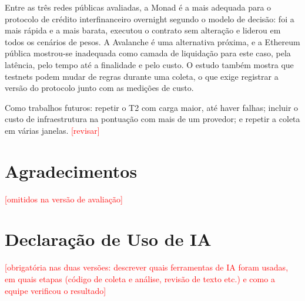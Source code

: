 \documentclass[10pt,a4paper]{article}
\newcommand{\pendente}[1]{\textcolor{red}{[#1]}}
\begin{document}
Entre as três redes públicas avaliadas, a Monad é a mais adequada para o protocolo de crédito interfinanceiro overnight segundo o modelo de decisão: foi a mais rápida e a mais barata, executou o contrato sem alteração e liderou em todos os cenários de pesos. A Avalanche é uma alternativa próxima, e a Ethereum pública mostrou-se inadequada como camada de liquidação para este caso, pela latência, pelo tempo até a finalidade e pelo custo. O estudo também mostra que testnets podem mudar de regras durante uma coleta, o que exige registrar a versão do protocolo junto com as medições de custo.

Como trabalhos futuros: repetir o T2 com carga maior, até haver falhas; incluir o custo de infraestrutura na pontuação com mais de um provedor; e repetir a coleta em várias janelas. \pendente{revisar}

\section*{Agradecimentos}
\pendente{omitidos na versão de avaliação}

\section*{Declaração de Uso de IA}
\pendente{obrigatória nas duas versões: descrever quais ferramentas de IA foram usadas, em quais etapas (código de coleta e análise, revisão de texto etc.) e como a equipe verificou o resultado}


\end{document}

